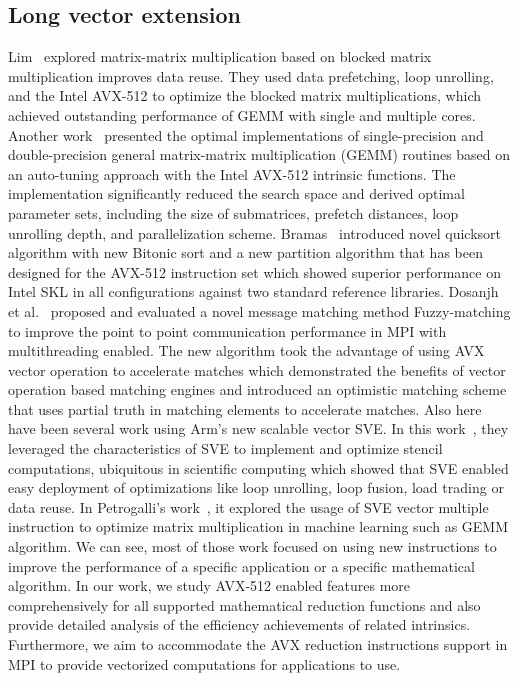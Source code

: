 \documentclass[sigconf,review]{acmart}
\newcommand{\sve}[0]{\textsc{SVE}\xspace}
\begin{document}
\subsection{Long vector extension}
Lim~\cite{Lim2018} explored matrix-matrix multiplication based on blocked matrix multiplication
improves data reuse. They used data prefetching, loop unrolling, and the Intel AVX-512
to optimize the blocked matrix multiplications, which achieved outstanding performance of GEMM
with single and multiple cores.
%
Another work~\cite{Kim19} presented the optimal implementations of single-precision and double-precision general matrix-matrix multiplication (GEMM) routines based on an auto-tuning approach with the Intel AVX-512 intrinsic functions.
The implementation significantly reduced the search space and derived optimal parameter sets, including the size of submatrices, prefetch distances, loop unrolling depth, and parallelization scheme.
%
Bramas~\cite{Bramas_2017} introduced novel quicksort algorithm with new Bitonic sort and a new
partition algorithm that has been designed for the AVX-512
instruction set which showed superior performance on Intel SKL in
all configurations against two standard reference libraries.
%
Dosanjh et al.~\cite{tag-match} proposed and evaluated a novel message matching method Fuzzy-matching
to improve the point to point communication performance in MPI with multithreading enabled.
The new algorithm took the advantage of using AVX vector operation to accelerate matches
which demonstrated the benefits of vector operation based
matching engines and introduced an optimistic
matching scheme that uses partial truth in matching elements
to accelerate matches.
%
Also here have been several work using Arm's new scalable vector SVE.
In this work~\cite{sve-stencil}, they leveraged the characteristics of \sve to implement and optimize
stencil computations, ubiquitous in scientific computing which showed
that \sve enabled easy deployment of optimizations like loop unrolling,
loop fusion, load trading or data reuse.
%
In Petrogalli's work~\cite{sve_ml}, it explored the usage of SVE vector multiple
instruction to optimize matrix multiplication in machine learning such as GEMM algorithm.
%
We can see, most of those work focused on using new instructions
to improve the performance of a specific application or a specific mathematical algorithm.
In our work, we study AVX-512 enabled features more comprehensively for
all supported mathematical reduction functions and also provide
detailed analysis of the efficiency achievements of related intrinsics.
Furthermore, we aim to accommodate the AVX reduction instructions support in MPI to provide
vectorized computations for applications to use.
\end{document}
